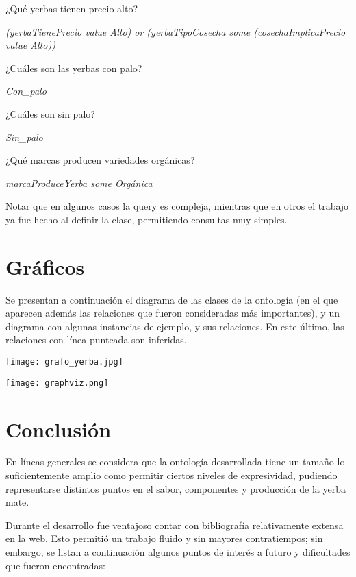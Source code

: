 \documentclass[12pt]{report}
\theoremstyle{plain} %
\begin{document}
¿Qué yerbas tienen precio alto?

\textit{(yerbaTienePrecio value Alto) or (yerbaTipoCosecha some (cosechaImplicaPrecio value Alto))}

¿Cuáles son las yerbas con palo?

\textit{Con\_palo}

¿Cuáles son sin palo?

\textit{Sin\_palo}

¿Qué marcas producen variedades orgánicas?

\textit{marcaProduceYerba some Orgánica}

\bigskip

Notar que en algunos casos la query es compleja, mientras que en otros el trabajo ya fue hecho al definir la clase, permitiendo consultas muy simples.

\section*{Gráficos}

Se presentan a continuación el diagrama de las clases de la ontología (en el que aparecen además las relaciones que fueron consideradas más importantes), y un diagrama con algunas instancias de ejemplo, y sus relaciones. En este último, las relaciones con línea punteada son inferidas.

\texttt{[image: grafo\_yerba.jpg]}

\texttt{[image: graphviz.png]}

\section*{Conclusión}

En líneas generales se considera que la ontología desarrollada tiene un tamaño lo suficientemente amplio como permitir ciertos niveles de expresividad, pudiendo representarse distintos puntos en el sabor, componentes y producción de la yerba mate.

Durante el desarrollo fue ventajoso contar con bibliografía relativamente extensa en la web. Esto permitió un trabajo fluido y sin mayores contratiempos; sin embargo, se listan a continuación algunos puntos de interés a futuro y dificultades que fueron encontradas:
\end{document}
